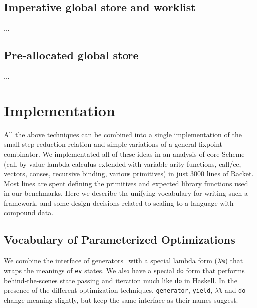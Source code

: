 \documentclass[preprint,onecolumn,9pt]{sigplanconf} %
\begin{document}
\subsection{Imperative global store and worklist}
...
\subsection{Pre-allocated global store}
...

\section{Implementation}

All the above techniques can be combined into a single implementation
of the small step reduction relation and simple variations of a
general fixpoint combinator. We implementated all of these ideas in an
analysis of core Scheme (call-by-value lambda calculus extended with
variable-arity functions, call/cc, vectors, conses, recursive binding,
various primitives) in just 3000 lines of Racket. Most lines are spent
defining the primitives and expected library functions used in our
benchmarks. Here we describe the unifying vocabulary for writing such
a framework, and some design decisions related to scaling to a
language with compound data.

\subsection{Vocabulary of Parameterized Optimizations}

We combine the interface of generators~\cite{ianjohnson:cluhistory}
with a special lambda form ({\tt $\lambda$\%}) that wraps the meanings
of {\tt ev} states. We also have a special {\tt do} form that performs
behind-the-scenes state passing and iteration much like {\tt do} in
Haskell. In the presence of the different optimization
techniques, {\tt generator}, {\tt yield}, {\tt $\lambda$\%} and {\tt do}
change meaning slightly, but keep the same interface as their names
suggest.
\end{document}
